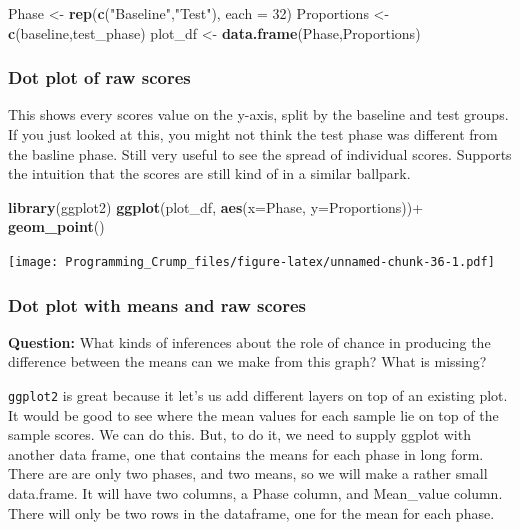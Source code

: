 \documentclass[]{book}
\newenvironment{Shaded}{\begin{snugshade}}{\end{snugshade}}
\newcommand{\KeywordTok}[1]{\textcolor[rgb]{0.13,0.29,0.53}{\textbf{{#1}}}}
\newcommand{\DataTypeTok}[1]{\textcolor[rgb]{0.13,0.29,0.53}{{#1}}}
\newcommand{\DecValTok}[1]{\textcolor[rgb]{0.00,0.00,0.81}{{#1}}}
\newcommand{\StringTok}[1]{\textcolor[rgb]{0.31,0.60,0.02}{{#1}}}
\newcommand{\NormalTok}[1]{{#1}}
\theoremstyle{definition}
\theoremstyle{definition}
\theoremstyle{definition}
\theoremstyle{remark}
\begin{document}
\begin{Shaded}
\begin{Highlighting}[]
\NormalTok{Phase <-}\StringTok{ }\KeywordTok{rep}\NormalTok{(}\KeywordTok{c}\NormalTok{(}\StringTok{"Baseline"}\NormalTok{,}\StringTok{"Test"}\NormalTok{), }\DataTypeTok{each =} \DecValTok{32}\NormalTok{)}
\NormalTok{Proportions <-}\StringTok{ }\KeywordTok{c}\NormalTok{(baseline,test_phase)}
\NormalTok{plot_df <-}\StringTok{ }\KeywordTok{data.frame}\NormalTok{(Phase,Proportions)}
\end{Highlighting}
\end{Shaded}

\subsubsection{Dot plot of raw scores}\label{dot-plot-of-raw-scores}

This shows every scores value on the y-axis, split by the baseline and
test groups. If you just looked at this, you might not think the test
phase was different from the basline phase. Still very useful to see the
spread of individual scores. Supports the intuition that the scores are
still kind of in a similar ballpark.

\begin{Shaded}
\begin{Highlighting}[]
\KeywordTok{library}\NormalTok{(ggplot2)}
\KeywordTok{ggplot}\NormalTok{(plot_df, }\KeywordTok{aes}\NormalTok{(}\DataTypeTok{x=}\NormalTok{Phase, }\DataTypeTok{y=}\NormalTok{Proportions))+}
\StringTok{  }\KeywordTok{geom_point}\NormalTok{()}
\end{Highlighting}
\end{Shaded}

\texttt{[image: Programming\_Crump\_files/figure-latex/unnamed-chunk-36-1.pdf]}

\subsubsection{Dot plot with means and raw
scores}\label{dot-plot-with-means-and-raw-scores}

\textbf{Question:} What kinds of inferences about the role of chance in
producing the difference between the means can we make from this graph?
What is missing?

\texttt{ggplot2} is great because it let's us add different layers on
top of an existing plot. It would be good to see where the mean values
for each sample lie on top of the sample scores. We can do this. But, to
do it, we need to supply ggplot with another data frame, one that
contains the means for each phase in long form. There are are only two
phases, and two means, so we will make a rather small data.frame. It
will have two columns, a Phase column, and Mean\_value column. There
will only be two rows in the dataframe, one for the mean for each phase.
\end{document}
